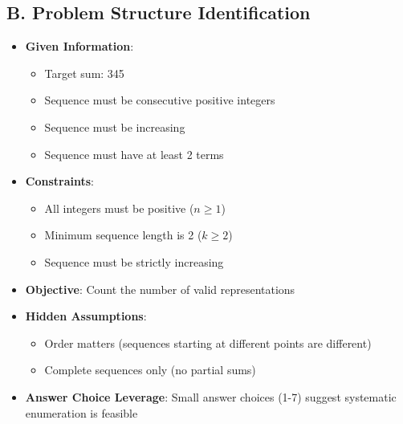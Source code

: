 \documentclass[11pt]{article}
\begin{document}
\begin{problemconfigbox}
\subsection*{B. Problem Structure Identification}
\begin{itemize}[leftmargin=*]
    \item \textbf{Given Information}: 
    \begin{itemize}
        \item Target sum: 345
        \item Sequence must be consecutive positive integers
        \item Sequence must be increasing
        \item Sequence must have at least 2 terms
    \end{itemize}
    \item \textbf{Constraints}: 
    \begin{itemize}
        \item All integers must be positive ($n \geq 1$)
        \item Minimum sequence length is 2 ($k \geq 2$)
        \item Sequence must be strictly increasing
    \end{itemize}
    \item \textbf{Objective}: Count the number of valid representations
    \item \textbf{Hidden Assumptions}: 
    \begin{itemize}
        \item Order matters (sequences starting at different points are different)
        \item Complete sequences only (no partial sums)
    \end{itemize}
    \item \textbf{Answer Choice Leverage}: Small answer choices (1-7) suggest systematic enumeration is feasible
\end{itemize}


\end{problemconfigbox}
\end{document}
